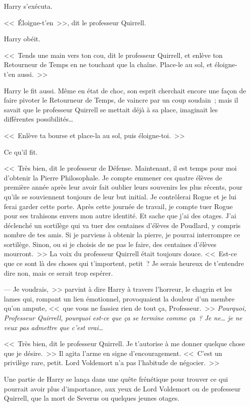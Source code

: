 Harry s'exécuta.

<<~Éloigne-t'en~>>, dit le professeur Quirrell.

Harry obéit.

<<~Tends une main vers ton cou, dit le professeur Quirrell, et enlève ton Retourneur de Temps en ne touchant que la chaîne. Place-le au sol, et éloigne-t'en aussi.~>>

Harry le fit aussi. Même en état de choc, son esprit cherchait encore une façon de faire pivoter le Retourneur de Temps, de vaincre par un coup soudain~; mais il savait que le professeur Quirrell se mettait déjà à sa place, imaginait les différentes possibilités…

<<~Enlève ta bourse et place-la au sol, puis éloigne-toi.~>>

Ce qu'il fit.

<<~Très bien, dit le professeur de Défense. Maintenant, il est temps pour moi d'obtenir la Pierre Philosophale. Je compte emmener ces quatre élèves de première année après leur avoir fait oublier leurs souvenirs les plus récents, pour qu'ils se souviennent toujours de leur but initial. Je contrôlerai Rogue et je lui ferai garder cette porte. Après cette journée de travail, je compte tuer Rogue pour ses trahisons envers mon autre identité. Et sache que j'ai des otages. J'ai déclenché un sortilège qui va tuer des centaines d'élèves de Poudlard, y compris nombre de tes amis. Si je parviens à obtenir la pierre, je pourrai interrompre ce sortilège. Sinon, ou si je choisis de ne pas le faire, des centaines d'élèves mourront.~>> La voix du professeur Quirrell était toujours douce. <<~Est-ce que ce sont là des choses qui t'importent, petit~? Je serais heureux de t'entendre dire non, mais ce serait trop espérer.

--- Je voudrais,~>> parvint à dire Harry à travers l'horreur, le chagrin et les lames qui, rompant un lien émotionnel, provoquaient la douleur d'un membre qu'on ampute, <<~que vous ne fassiez rien de tout ça, Professeur.~>> \emph{Pourquoi, Professeur Quirrell, pourquoi est-ce que ça se termine comme ça~? Je ne… je ne veux pas admettre que c'est vrai…}

<<~Très bien, dit le professeur Quirrell. Je t'autorise à me donner quelque chose que je désire.~>> Il agita l'arme en signe d'encouragement. <<~C'est un privilège rare, petit. Lord Voldemort n'a pas l'habitude de négocier.~>>

Une partie de Harry se lança dans une quête frénétique pour trouver ce qui pourrait avoir plus d'importance, aux yeux de Lord Voldemort ou de professeur Quirrell, que la mort de Severus ou quelques jeunes otages.

